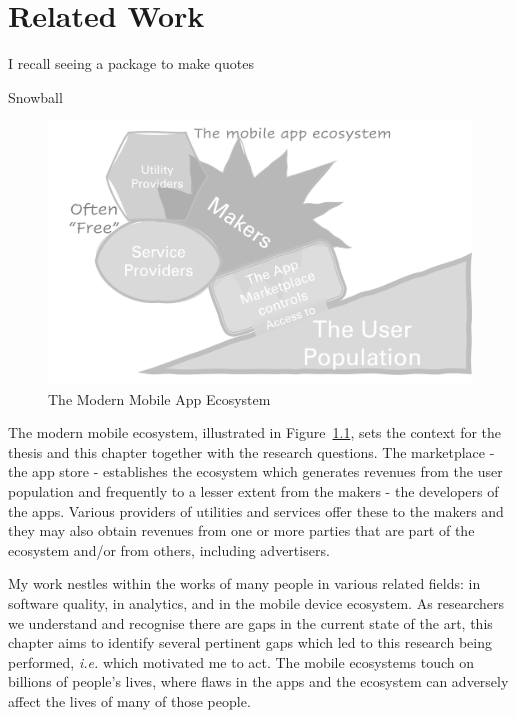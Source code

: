\setchapterpreamble[u]{\margintoc}
\chapter{Related Work}
\label{chapter-related-work}
\epigraph{I recall seeing a package to make quotes}{Snowball} %


\begin{figure}
    \centering
    \includegraphics[width=\linewidth]{images/my/the-mobile-app-ecosystem-27-jul-2022.jpg}
    \caption{The Modern Mobile App Ecosystem}
    \label{fig:my_modern-mobile-app-ecosystem}
\end{figure}

The modern mobile ecosystem, illustrated in Figure~\ref{fig:my_modern-mobile-app-ecosystem}, 
sets the context for the thesis and this chapter together with the research questions. The marketplace - the app store - establishes the ecosystem which generates revenues from the user population and frequently to a lesser extent from the makers -  the developers of the apps. Various providers of utilities and services offer these to the makers and they may also obtain revenues from one or more parties that are part of the ecosystem and/or from others, including advertisers.

My work nestles within the works of many people in various related fields: in software quality, in analytics, and in the mobile device ecosystem. As researchers we understand and recognise there are gaps in the current state of the art, this chapter aims to identify several pertinent gaps which led to this research being performed, \emph{i.e.} which motivated me to act. The mobile ecosystems touch on billions of people's lives, where flaws in the apps and the ecosystem can adversely affect the lives of many of those people. 

